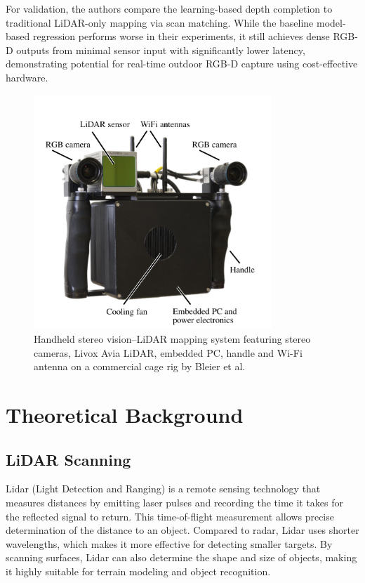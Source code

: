 \documentclass[english, bachelor, utf8]{base/thesis_telematics}
\begin{document}
For validation, the authors compare the learning-based depth completion to traditional LiDAR-only 
mapping via scan matching. While the baseline model-based regression performs worse in their experiments, 
it still achieves dense RGB-D outputs from minimal sensor input with significantly lower latency, 
demonstrating potential for real-time outdoor RGB-D capture using cost-effective hardware.

\begin{figure}[htbp]
    \centering
    \includegraphics[width=0.8\textwidth]{pics/Handheld_Bleier.png}
    \caption{Handheld stereo vision--LiDAR mapping system featuring stereo cameras, 
    Livox Avia LiDAR, embedded PC, handle and Wi-Fi antenna on a commercial cage rig by Bleier et al.~\cite{bleier2024}}
    \label{fig:bleier_handheld_design}
\end{figure}

\chapter{Theoretical Background}

\section{LiDAR Scanning}
Lidar (Light Detection and Ranging) is a remote sensing technology that measures distances by emitting laser
pulses and recording the time it takes for the reflected signal to return. This time-of-flight measurement
allows precise determination of the distance to an object. Compared to radar, Lidar uses shorter wavelengths,
which makes it more effective for detecting smaller targets. By scanning surfaces, Lidar can also determine
the shape and size of objects, making it highly suitable for terrain modeling and object recognition.
\end{document}
